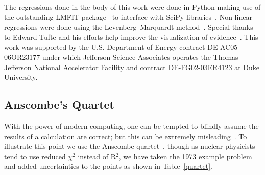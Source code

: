 \documentclass[10pt,superscriptaddress,aps,prc,twocolumn]{revtex4-1}
\begin{document}
\begin{acknowledgments}
The regressions done in the body of this work were done in Python making use of the
outstanding LMFIT package~\cite{Newville:2014} to interface with SciPy
libraries~\cite{Jones:2001}.  Non-linear regressions were done using the
Levenberg–Marquardt method~\cite{Levenberg:1944,Marquardt:1963}.  Special
thanks to Edward Tufte and his efforts help improve the visualization of 
evidence~\cite{Tufte:1986,Tufte:1990,Tufte:1997,Tufte:2006}.
This work was supported by the U.S.  Department of Energy contract DE-AC05-06OR23177
under which Jefferson Science Associates operates the Thomas Jefferson National 
Accelerator Facility and contract DE-FG02-03ER4123 at Duke University.
\end{acknowledgments}


\begin{appendix}

\section{Anscombe's Quartet}

With the power of modern computing, one can be tempted to blindly assume the results of
a calculation are correct; but this can be extremely misleading~\cite{Sirca:2012}.  To illustrate
this point we use the Anscombe quartet~\cite{Anscombe:1973}, though as nuclear physicists tend 
to use reduced $\chi^2$ instead of R$^2$, we have taken the 1973 example
problem and added uncertainties to the points as shown in Table~\ref{quartet}.


\end{appendix}
\end{document}
